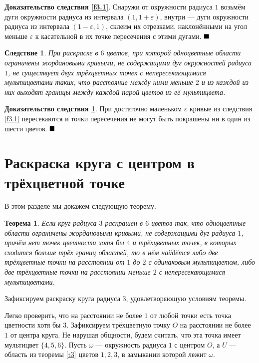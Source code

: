 \documentclass[12pt,a4paper]{article}
\newtheorem{theorem}{Теорема}
\newtheorem{corollary}{Следствие}[theorem]
\renewcommand{\qed}{$\blacksquare \vspace{5mm}$}
\begin{document}
\textbf{Доказательство следствия \ref{f3.1}}. Снаружи от окружности радиуса $1$ возьмём дуги окружности радиуса из интервала $(1, 1 + \varepsilon)$, внутри --- дуги окружности радиуса из интервала $(1 - \varepsilon, 1)$, склеим их отрезками, наклонёнными на угол меньше $\varepsilon$ к касательной в их точке пересечения с этими дугами. \qed

\begin{corollary} \label{f3.2}
	При раскраске в $6$ цветов, при которой одноцветные области ограничены жордановыми кривыми, не содержащими дуг окружностей радиуса $1$, не существует двух трёхцветных точек с непересекающимися мультицветами таких, что расстояние между ними меньше $2$ и из каждой из них выходят границы между каждой парой цветов из её мультицвета.
\end{corollary}

\textbf{Доказательство следствия \ref{f3.2}}. При достаточно маленьком $\varepsilon$ кривые из следствия \ref{f3.1} пересекаются и точки пересечения не могут быть покрашены ни в один из шести цветов. \qed

\section{Раскраска круга с центром в трёхцветной точке}

В этом разделе мы докажем следующую теорему.

\begin{theorem} \label{t10}
	Если круг радиуса $3$ раскрашен в $6$ цветов так, что одноцветные области ограничены жордановыми кривыми, не содержащими дуг радиуса $1$, причём нет точек цветности хотя бы $4$ и трёхцветных точек, в которых сходится больше трёх границ областей, то в нём найдётся либо две трёхцветные точки на расстоянии от $1$ до $2$ с одинаковым мультицветом, либо две трёхцветные точки на расстоянии меньше $2$ с непересекающимися мультицветами.
\end{theorem}


Зафиксируем раскраску круга радиуса $3$, удовлетворяющую условиям теоремы.

Легко проверить, что на расстоянии не более $1$ от любой точки есть точка цветности хотя бы $3$. Зафиксируем трёхцветную точку $O$ на расстоянии не более $1$ от центра круга. Не нарушая общности, будем считать, что эта точка имеет мультицвет $\{4, 5, 6\}$. Пусть $\omega$ --- окружность радиуса $1$ с центром $O$, а $U$ --- область из теоремы \ref{t3} цветов $1, 2, 3$, в замыкании которой лежит $\omega$. 
\end{document}
